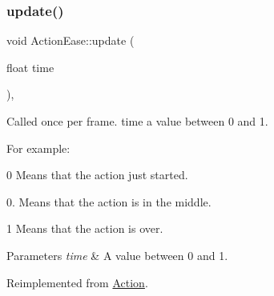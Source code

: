 \mbox{\label{classActionEase_a77679f09c02cf75fb54776470c339fc5}} 
\subsubsection{\texorpdfstring{update()}{update()}\hspace{0.1cm}{\footnotesize\ttfamily [2/2]}}
{\footnotesize\ttfamily void Action\+Ease\+::update (\begin{DoxyParamCaption}\item[{float}]{time }\end{DoxyParamCaption})\hspace{0.3cm}{\ttfamily [override]}, {\ttfamily [virtual]}}

Called once per frame. time a value between 0 and 1.

For example\+:
\begin{DoxyItemize}
\item 0 Means that the action just started.
\item 0. Means that the action is in the middle.
\item 1 Means that the action is over.
\end{DoxyItemize}


\begin{DoxyParams}{Parameters}
{\em time} & A value between 0 and 1. \\
\hline
\end{DoxyParams}


Reimplemented from \hyperlink{classAction_a937e646e63915e33ad05ba149bfcf239}{Action}.



